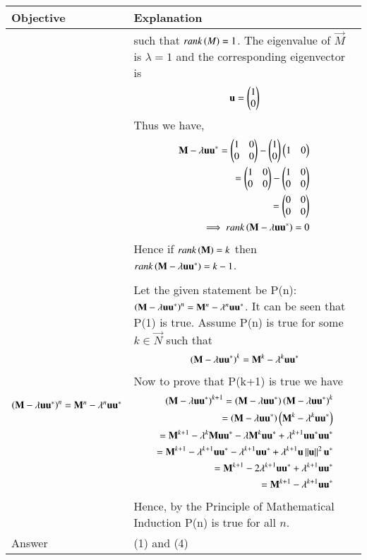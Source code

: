 \documentclass[journal,12pt,twocolumn]{IEEEtran}
\begin{document}
\clearpage
\begin{table}[htbp]
        \centering
\begin{tabular}{|m{2.0in}|m{5.0in}|} \hline
		\textbf{Objective} & \textbf{Explanation} \\ \hline
		&
	such that $rank\left(M\right)=1$. The eigenvalue of $\vec{M}$ is $\lambda=1$ 
	and the corresponding eigenvector is
	\begin{align}
	\mathbf{u}=\begin{pmatrix}1\\0\end{pmatrix}
	\end{align}
	Thus we have,
	\begin{align}
	\mathbf{M}-\lambda\mathbf{uu^*}=\begin{pmatrix}1&0\\0&0\end{pmatrix}-\begin{pmatrix}1\\0\end{pmatrix}\begin{pmatrix}1&0\end{pmatrix} \\
		=\begin{pmatrix}1&0\\0&0\end{pmatrix}-\begin{pmatrix}1&0\\0&0\end{pmatrix} \\
		=\begin{pmatrix}0&0\\0&0\end{pmatrix} \\
		\implies rank\left(\mathbf{M}-\lambda\mathbf{uu^*}\right)=0
	\end{align}
Hence if $rank\left(\mathbf{M}\right)=k$ 
		then $rank\left(\mathbf{M}-\lambda\mathbf{uu^*}\right)=k-1$. \\ 
		& \\ \hline
	$\left(\mathbf{M}-\lambda\mathbf{uu^*}\right)^n=\mathbf{M}^n-\lambda^n\mathbf{uu^*}$  & 
		Let the given statement be 
	P(n):$\left(\mathbf{M}-\lambda\mathbf{uu^*}\right)^n=\mathbf{M}^n-\lambda^n\mathbf{uu^*}$.
		It can be seen that P(1) is true. Assume P(n) is true for some 
		$k\in \vec{N}$ such that
	\begin{align}
	\left(\mathbf{M}-\lambda\mathbf{uu^*}\right)^k=\mathbf{M}^k-\lambda^k\mathbf{uu^*}
	\end{align}
	Now to prove that P(k+1) is true we have
	\begin{align}
	\left(\mathbf{M}-\lambda\mathbf{uu^*}\right)^{k+1}
	=\left(\mathbf{M}-\lambda\mathbf{uu^*}\right)\left(\mathbf{M}-\lambda\mathbf{uu^*}\right)^k \\
	=\left(\mathbf{M}-\lambda\mathbf{uu^*}\right)\left(\mathbf{M}^k-\lambda^k\mathbf{uu^*}\right) \\
	=\mathbf{M}^{k+1}-\lambda^k\mathbf{Muu^*}-\lambda\mathbf{M}^k\mathbf{uu^*} + 
		\lambda^{k+1}\mathbf{uu^*uu^*} \\
	=\mathbf{M}^{k+1}-\lambda^{k+1}\mathbf{uu^*}-\lambda^{k+1}\mathbf{uu^*} +
		\lambda^{k+1}\mathbf{u}\left\lVert\mathbf{u}\right\rVert^2\mathbf{u}^* \\
	=\mathbf{M}^{k+1}-2\lambda^{k+1}\mathbf{uu^*}+\lambda^{k+1}\mathbf{uu^*} \\
	=\mathbf{M}^{k+1}-\lambda^{k+1}\mathbf{uu^*}
	\end{align}
	Hence, by the Principle of Mathematical Induction P(n) is true for all 
	$n$.\\ \hline
		Answer& (1) and (4) \\ \hline
\end{tabular}
        \caption{} \label{1}
\end{table}
\end{document}

